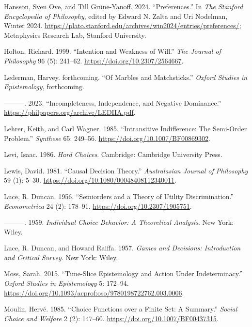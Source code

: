 \documentclass[
  10.5pt,
  twoside]{article}
\newlength{\cslhangindent}
\newenvironment{CSLReferences}[2] %
 {\begin{list}{}{%
  \setlength{\itemindent}{0pt}
  \setlength{\leftmargin}{0pt}
  \setlength{\parsep}{0pt}
  \ifodd #1
   \setlength{\leftmargin}{\cslhangindent}
   \setlength{\itemindent}{-1\cslhangindent}
  \fi
  \setlength{\itemsep}{#2\baselineskip}}}
 {\end{list}}
\begin{document}
\begin{CSLReferences}{1}{0}
Hansson, Sven Ove, and Till Grüne-Yanoff. 2024. {``{Preferences}.''} In
\emph{The {Stanford} Encyclopedia of Philosophy}, edited by Edward N.
Zalta and Uri Nodelman, {W}inter 2024.
\url{https://plato.stanford.edu/archives/win2024/entries/preferences/};
Metaphysics Research Lab, Stanford University.

Holton, Richard. 1999. {``Intention and Weakness of Will.''} \emph{The
Journal of Philosophy} 96 (5): 241--62.
\url{https://doi.org/10.2307/2564667}.

Lederman, Harvey. forthcoming. {``Of Marbles and Matchsticks.''}
\emph{Oxford Studies in Epistemology}, forthcoming.

---------. 2023. {``Incompleteness, Independence, and Negative
Dominance.''} \url{https://philpapers.org/archive/LEDIIA.pdf}.

Lehrer, Keith, and Carl Wagner. 1985. {``Intransitive Indifference: The
Semi-Order Problem.''} \emph{Synthese} 65: 249--56.
\url{https://doi.org/10.1007/BF00869302}.

Levi, Isaac. 1986. \emph{Hard Choices}. Cambridge: Cambridge University
Press.

Lewis, David. 1981. {``Causal Decision Theory.''} \emph{Australasian
Journal of Philosophy} 59 (1): 5--30.
\url{https://doi.org/10.1080/00048408112340011}.

Luce, R. Duncan. 1956. {``Semiorders and a Theory of Utility
Discrimination.''} \emph{Econometrica} 24 (2): 178--91.
\url{https://doi.org/10.2307/1905751}.

---------. 1959. \emph{Individual Choice Behavior: A Theoretical
Analysis}. New York: Wiley.

Luce, R. Duncan, and Howard Raiffa. 1957. \emph{Games and Decisions:
Introduction and Critical Survey}. New York: Wiley.

Moss, Sarah. 2015. {``Time-Slice Epistemology and Action Under
Indeterminacy.''} \emph{Oxford Studies in Epistemology} 5: 172--94.
\url{https://doi.org/10.1093/acprof:oso/9780198722762.003.0006}.

Moulin, Hervé. 1985. {``Choice Functions over a Finite Set: A
Summary.''} \emph{Social Choice and Welfare} 2 (2): 147--60.
\url{https://doi.org/10.1007/BF00437315}.


\end{CSLReferences}
\end{document}
